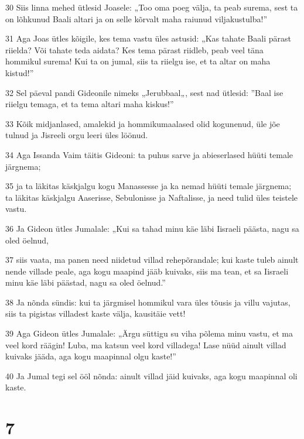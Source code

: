 \par 30 Siis linna mehed ütlesid Joasele: „Too oma poeg välja, ta peab surema, sest ta on lõhkunud Baali altari ja on selle kõrvalt maha raiunud viljakustulba!”
\par 31 Aga Joas ütles kõigile, kes tema vastu üles astusid: „Kas tahate Baali pärast riielda? Või tahate teda aidata? Kes tema pärast riidleb, peab veel täna hommikul surema! Kui ta on jumal, siis ta riielgu ise, et ta altar on maha kistud!”
\par 32 Sel päeval pandi Gideonile nimeks „Jerubbaal„, sest nad ütlesid: ”Baal ise riielgu temaga, et ta tema altari maha kiskus!”
\par 33 Kõik midjanlased, amalekid ja hommikumaalased olid kogunenud, üle jõe tulnud ja Jisreeli orgu leeri üles löönud.
\par 34 Aga Issanda Vaim täitis Gideoni: ta puhus sarve ja abieserlased hüüti temale järgnema;
\par 35 ja ta läkitas käskjalgu kogu Manassesse ja ka nemad hüüti temale järgnema; ta läkitas käskjalgu Aaserisse, Sebulonisse ja Naftalisse, ja need tulid üles teistele vastu.
\par 36 Ja Gideon ütles Jumalale: „Kui sa tahad minu käe läbi Iisraeli päästa, nagu sa oled öelnud,
\par 37 siis vaata, ma panen need niidetud villad rehepõrandale; kui kaste tuleb ainult nende villade peale, aga kogu maapind jääb kuivaks, siis ma tean, et sa Iisraeli minu käe läbi päästad, nagu sa oled öelnud.”
\par 38 Ja nõnda sündis: kui ta järgmisel hommikul vara üles tõusis ja villu vajutas, siis ta pigistas villadest kaste välja, kausitäie vett!
\par 39 Aga Gideon ütles Jumalale: „Ärgu süttigu su viha põlema minu vastu, et ma veel kord räägin! Luba, ma katsun veel kord villadega! Lase nüüd ainult villad kuivaks jääda, aga kogu maapinnal olgu kaste!”
\par 40 Ja Jumal tegi sel ööl nõnda: ainult villad jäid kuivaks, aga kogu maapinnal oli kaste.

\chapter{7}

